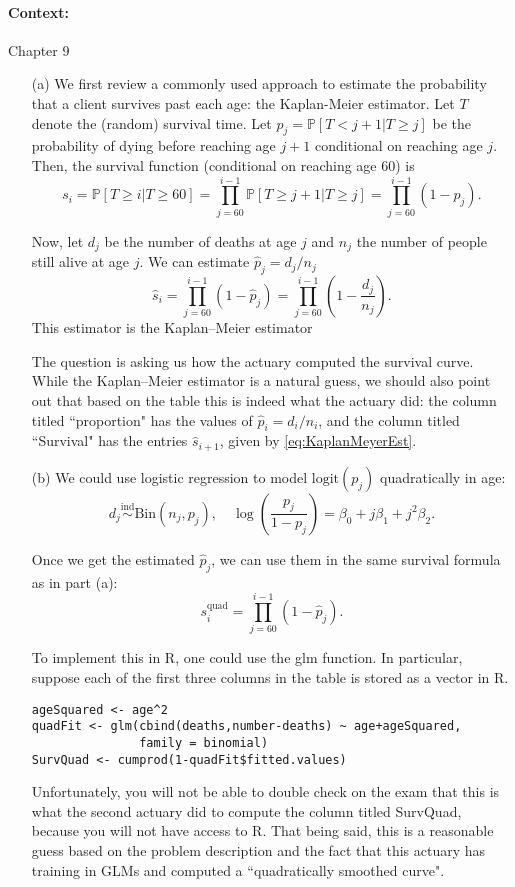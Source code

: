 \paragraph{Context:} \citet{efron2016computer} Chapter 9
\begin{itemize}
\item[(a)] We first review a commonly used approach to estimate the probability that a client survives past each age: the Kaplan-Meier estimator.
Let $T$ denote the (random) survival time. Let $p_j = \mathbb P[T < j+1|T \geq j]$ be the probability of dying before reaching age $j+1$ conditional on reaching age $j$. Then, the survival function (conditional on reaching age 60) is 
\begin{equation*} s_i = \mathbb P[T \geq i|T \geq 60] = \prod_{j = 60}^{i-1} \mathbb P[T \geq j+1|T \geq j] = \prod_{j = 60}^{i-1} (1-p_j).
\end{equation*}

Now, let $d_j$ be the number of deaths at age $j$ and $n_j$ the number of people still alive at age $j$. We can estimate $\hat p_j = d_j/n_j$
\begin{equation} 
\hat s_i = \prod_{j = 60}^{i-1} (1-\hat p_j) = \prod_{j = 60}^{i-1} \left(1-\frac{d_j}{n_j}\right).
\label{eq:KaplanMeyerEst}
\end{equation}
This estimator is the Kaplan--Meier estimator

The question is asking us how the actuary computed the survival curve. While the Kaplan--Meier estimator is a natural guess, we should also point out that based on the table this is indeed what the actuary did: the column titled ``proportion" has the values of  $\hat p_i = d_i/n_i$, and the column titled ``Survival" has the entries $\hat s_{i+1}$, given by \eqref{eq:KaplanMeyerEst}.

\item[(b)] We could use logistic regression to model $\text{logit}(p_j)$ quadratically in age:
\[d_j \overset{\text{ind}}\sim \text{Bin}(n_j, p_j), \quad \log\left(\frac{p_j}{1-p_j}\right) = \beta_0 + j\beta_1 + j^2\beta_2.\]

Once we get the estimated $\hat{p}_j$, we can use them in the same survival formula as in part (a): 
\[s^{\text{quad}}_i = \prod_{j=60}^{i-1}(1-\hat{p}_j).\]

To implement this in R, one could use the glm function. In particular, suppose each of the first three columns in the table is stored as a vector in R.
\begin{lstlisting}
ageSquared <- age^2
quadFit <- glm(cbind(deaths,number-deaths) ~ age+ageSquared, 
			   family = binomial)
SurvQuad <- cumprod(1-quadFit$fitted.values)
\end{lstlisting}

Unfortunately, you will not be able to double check on the exam that this is what the second actuary did to compute the column titled SurvQuad, because you will not have access to R. That being said, this is a reasonable guess based on the problem description and the fact that this actuary has training in GLMs and computed a ``quadratically smoothed curve". 
\end{itemize}

